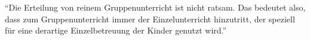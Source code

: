 \enquote{Die  Erteilung von reinem Gruppenunterricht ist nicht ratsam. Das
bedeutet also, dass zum Gruppenunterricht immer der Einzelunterricht hinzutritt,
der speziell für eine derartige Einzelbetreuung der Kinder genutzt wird.}
\autocite[57]{ernst:die_zukunftsfaehige_musikschule}












